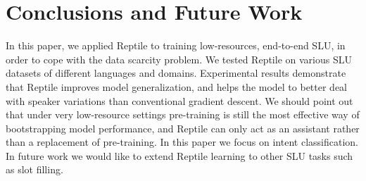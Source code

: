 \documentclass[a4paper]{article}
\begin{document}
	\section{Conclusions and Future Work}
	In this paper, we applied Reptile to training low-resources, end-to-end SLU, in order to cope with the data scarcity problem. We tested Reptile on various SLU datasets of different languages and domains. Experimental results demonstrate that Reptile improves model generalization, and helps the model to better deal with speaker variations than conventional gradient descent. We should point out that under very low-resource settings pre-training is still the most effective way of bootstrapping model performance, and Reptile can only act as an assistant rather than a replacement of pre-training. In this paper we focus on intent classification. In future work we would like to extend Reptile learning to other SLU tasks such as slot filling.
	
	
	
	
	
	
\end{document}
